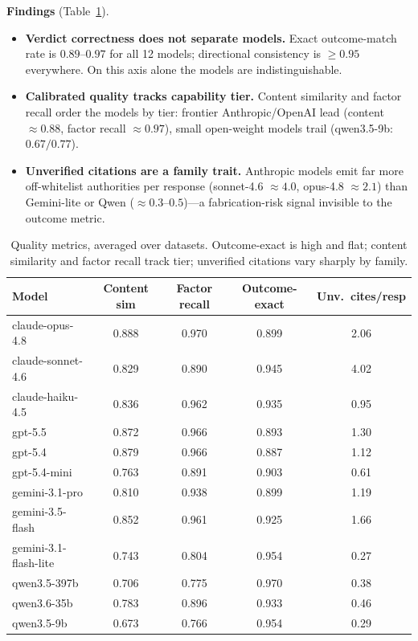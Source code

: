 \documentclass{article}
\begin{document}
\textbf{Findings} (Table~\ref{tab:quality}).
\begin{itemize}
\item \textbf{Verdict correctness does not separate models.} Exact outcome-match rate is
  $0.89$--$0.97$ for all 12 models; directional consistency is $\geq 0.95$ everywhere. On this
  axis alone the models are indistinguishable.
\item \textbf{Calibrated quality tracks capability tier.} Content similarity and factor recall
  order the models by tier: frontier Anthropic/OpenAI lead (content $\approx 0.88$, factor
  recall $\approx 0.97$), small open-weight models trail (qwen3.5-9b: $0.67 / 0.77$).
\item \textbf{Unverified citations are a family trait.} Anthropic models emit far more
  off-whitelist authorities per response (sonnet-4.6 $\approx 4.0$, opus-4.8 $\approx 2.1$)
  than Gemini-lite or Qwen ($\approx 0.3$--$0.5$)---a fabrication-risk signal invisible to the
  outcome metric.
\end{itemize}

\begin{table}[t]
\caption{Quality metrics, averaged over datasets. Outcome-exact is high and flat; content
similarity and factor recall track tier; unverified citations vary sharply by family.}
\label{tab:quality}
\centering
\begin{tabular}{lcccc}
\toprule
Model & Content sim & Factor recall & Outcome-exact & Unv.\ cites/resp \\
\midrule
claude-opus-4.8       & 0.888 & 0.970 & 0.899 & 2.06 \\
claude-sonnet-4.6     & 0.829 & 0.890 & 0.945 & 4.02 \\
claude-haiku-4.5      & 0.836 & 0.962 & 0.935 & 0.95 \\
gpt-5.5               & 0.872 & 0.966 & 0.893 & 1.30 \\
gpt-5.4               & 0.879 & 0.966 & 0.887 & 1.12 \\
gpt-5.4-mini          & 0.763 & 0.891 & 0.903 & 0.61 \\
gemini-3.1-pro        & 0.810 & 0.938 & 0.899 & 1.19 \\
gemini-3.5-flash      & 0.852 & 0.961 & 0.925 & 1.66 \\
gemini-3.1-flash-lite & 0.743 & 0.804 & 0.954 & 0.27 \\
qwen3.5-397b          & 0.706 & 0.775 & 0.970 & 0.38 \\
qwen3.6-35b           & 0.783 & 0.896 & 0.933 & 0.46 \\
qwen3.5-9b            & 0.673 & 0.766 & 0.954 & 0.29 \\
\bottomrule
\end{tabular}
\end{table}
\end{document}
